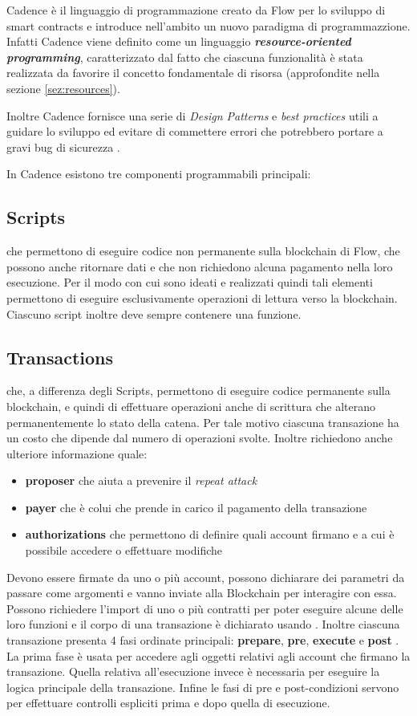 Cadence è il linguaggio di programmazione creato da Flow per lo sviluppo di smart contracts e introduce nell'ambito un nuovo paradigma di programmazzione. Infatti Cadence viene definito come un linguaggio \textbf{\textit{resource-oriented programming}}, caratterizzato dal fatto che ciascuna funzionalità è stata realizzata da favorire il concetto fondamentale di risorsa (approfondite nella sezione \ref{sez:resources}).

Inoltre Cadence fornisce una serie di \textit{Design Patterns} e \textit{best practices} utili a guidare lo sviluppo ed evitare di commettere errori che potrebbero portare a gravi bug di sicurezza \cite{web:design-pattern}.

In Cadence esistono tre componenti programmabili principali:
\subsection*{Scripts}
che permettono di eseguire codice non permanente sulla blockchain di Flow, che possono anche ritornare dati e che non richiedono alcuna pagamento nella loro esecuzione. Per il modo con cui sono ideati e realizzati quindi tali elementi permettono di eseguire esclusivamente operazioni di lettura verso la blockchain. Ciascuno script inoltre deve sempre contenere una funzione.
\subsection*{Transactions}
che, a differenza degli Scripts, permettono di eseguire codice permanente sulla blockchain, e quindi di effettuare operazioni anche di scrittura che alterano permanentemente lo stato della catena. Per tale motivo ciascuna transazione ha un costo che dipende dal numero di operazioni svolte. Inoltre richiedono anche ulteriore informazione quale:

\begin{itemize}
    \item \textbf{proposer} che aiuta a prevenire il \textit{repeat attack}
    \item \textbf{payer} che è colui che prende in carico il pagamento della transazione
    \item \textbf{authorizations} che permettono di definire quali account firmano e a cui è possibile accedere o effettuare modifiche
\end{itemize}

Devono essere firmate da uno o più account, possono dichiarare dei parametri da passare come argomenti e vanno inviate alla Blockchain per interagire con essa. Possono richiedere l'import di uno o più contratti per poter eseguire alcune delle loro funzioni e il corpo di una transazione è dichiarato usando . Inoltre ciascuna transazione presenta 4 fasi ordinate principali: \textbf{prepare}, \textbf{pre}, \textbf{execute} e \textbf{post} . La prima fase è usata per accedere agli oggetti relativi agli account che firmano la transazione. Quella relativa all'esecuzione invece è necessaria per eseguire la logica principale della transazione. Infine le fasi di pre e post-condizioni servono per effettuare controlli espliciti prima e dopo quella di esecuzione.
